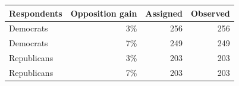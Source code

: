 \begin{tabular}{lrrr}
\toprule
Respondents & Opposition gain & Assigned & Observed \\
\midrule
Democrats & 3\% & 256 & 256 \\
Democrats & 7\% & 249 & 249 \\
Republicans & 3\% & 203 & 203 \\
Republicans & 7\% & 203 & 203 \\
\bottomrule
\end{tabular}
